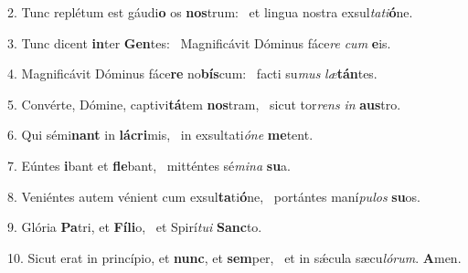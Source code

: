 2. Tunc replétum est gáudi\textbf{o} os \textbf{nos}trum: \ast\  et lingua nostra exsul\textit{ta}\textit{ti}\textbf{ó}ne.\

3. Tunc dicent \textbf{in}ter \textbf{Gen}tes: \ast\  Magnificávit Dóminus fáce\textit{re} \textit{cum} \textbf{e}is.\

4. Magnificávit Dóminus fáce\textbf{re} no\textbf{bís}cum: \ast\  facti su\textit{mus} \textit{læ}\textbf{tán}tes.\

5. Convérte, Dómine, captivi\textbf{tá}tem \textbf{nos}tram, \ast\  sicut tor\textit{rens} \textit{in} \textbf{aus}tro.\

6. Qui sémi\textbf{nant} in \textbf{lá}\textbf{cri}mis, \ast\  in exsultati\textit{ó}\textit{ne} \textbf{me}tent.\

7. Eúntes \textbf{i}bant et \textbf{fle}bant, \ast\  mitténtes sé\textit{mi}\textit{na} \textbf{su}a.\

8. Veniéntes autem vénient cum exsul\textbf{ta}ti\textbf{ó}ne, \ast\  portántes maní\textit{pu}\textit{los} \textbf{su}os.\

9. Glória \textbf{Pa}tri, et \textbf{Fí}\textbf{li}o, \ast\  et Spirí\textit{tu}\textit{i} \textbf{Sanc}to.\

10. Sicut erat in princípio, et \textbf{nunc}, et \textbf{sem}per, \ast\  et in sǽcula sæcu\textit{ló}\textit{rum}. \textbf{A}men.\

